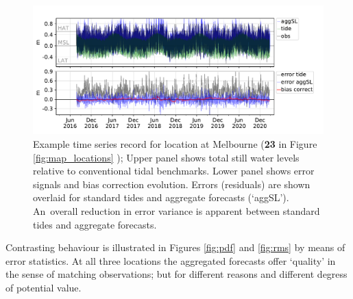 \begin{figure}[H]
    \centering
    \includegraphics[width=\figwidthFull]{figures/plots/586204_verify_ts.pdf}
    \caption{ Example time series record for location at Melbourne (\textbf{23} in Figure \ref{fig:map_locations} ); Upper panel shows total still water levels relative to conventional tidal benchmarks. Lower panel shows error signals and bias correction evolution.  Errors (residuals) are shown overlaid for standard tides and aggregate forecasts (`aggSL').  An~overall reduction in error variance is apparent between standard tides and aggregate forecasts.}
\label{fig:ts_melb}
\end{figure}   


Contrasting behaviour is illustrated in Figures \ref{fig:pdf} and \ref{fig:rms} by means of error statistics.
At all three locations the aggregated forecasts offer `quality' in the sense of matching observations; but for different reasons and different degress of potential value. 


